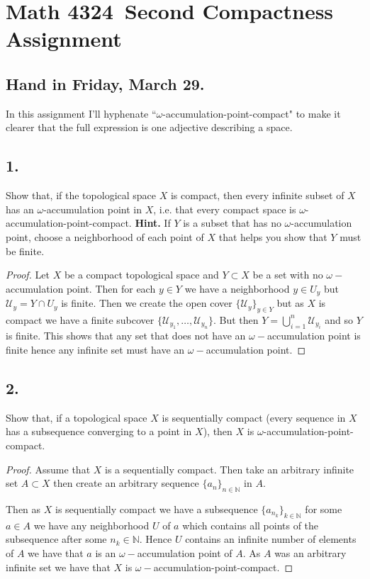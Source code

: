 \documentclass{amsart}
\theoremstyle{plain}
\theoremstyle{definition}
\theoremstyle{remark}
\begin{document}
\section*{Math 4324\  Second Compactness Assignment} 

\subsection*{Hand in Friday, March 29.} 

\vspace{.15in}
In this assignment I'll hyphenate ``$\omega$-accumulation-point-compact" to make it clearer that the full expression is one adjective describing a space. 


\vspace{.15in}
\noindent
\subsection*{1.}  Show that, if the topological space $X$ is compact, then every infinite subset of $X$ has an $\omega$-accumulation point in $X$, i.e. that every compact space is $\omega$-accumulation-point-compact. {\bfseries Hint.} If $Y$ is a subset that has no $\omega$-accumulation point, choose a neighborhood of each point of $X$ that helps you show that $Y$ must be finite. 

\begin{proof}
    Let $X$ be a compact topological space and $Y\subset X$ be a set with no $\omega-$accumulation point. Then for each $y \in Y$ we have a neighborhood $y\in U_y$ but $\mathcal U_y=Y\cap U_y$ is finite. Then we create the open cover $\{\mathcal U_y\}_{y\in Y}$ but as $X$ is compact we have a finite subcover $\{\mathcal U_{y_1},\ldots,\mathcal U_{y_n}\}$. But then $Y= \bigcup_{i=1}^n \mathcal U_{y_i}$ and so $Y$ is finite. This shows that any set that does not have an $\omega-$accumulation point is finite hence any infinite set must have an $\omega-$accumulation point.
\end{proof}


\vspace{.15in}
\noindent
\subsection*{2.} Show that, if a topological space $X$ is sequentially compact (every sequence in $X$ has a subsequence converging to a point in $X$), then $X$ is $\omega$-accumulation-point-compact. 

\begin{proof}
    Assume that $X$ is a sequentially compact. Then take an arbitrary infinite set $A\subset X$ then create an arbitrary sequence $\{a_n\}_{n\in \mathbb{N}}$ in $A$. 
    
    
    Then as $X$ is sequentially compact we have a subsequence $\{a_{n_k}\}_{k\in \mathbb{N}}$ for some $a\in A$ we have any neighborhood $U$ of $a$ which contains all points of the subsequence after some $n_k\in \mathbb{N}$. 
    Hence $U$ contains an infinite number of elements of $A$ we have that $a$ is an $\omega-$accumulation point of $A$. As $A$ was an arbitrary infinite set we have that $X$ is $\omega-$accumulation-point-compact.
\end{proof}
\end{document}
